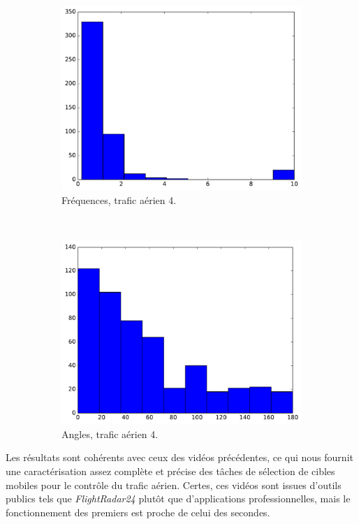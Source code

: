 \begin{figure}
\begin{subfigure}[t]{\subImgWclicks}
			\includegraphics[width=\textwidth]{figures/ch3/flightradar2a_frequency}
			\caption{Fréquences, trafic aérien 4.}
			\label{fig:flightradar2a_frequency}
		\end{subfigure}
		~
		\begin{subfigure}[t]{\subImgWclicks}
			\centering
			\includegraphics[width=\textwidth]{figures/ch3/flightradar2a_angle}
			\caption{Angles, trafic aérien 4.}
			\label{fig:flightradar2a_angle}
		\end{subfigure}
		\caption[Histogrammes, contrôle du trafic aérien, bis]{}
		\label{fig:histAirControl34}
	\end{figure}
	
	Les résultats sont cohérents avec ceux des vidéos précédentes, ce qui nous fournit une caractérisation assez complète et précise des tâches de sélection de cibles mobiles pour le contrôle du trafic aérien. Certes, ces vidéos sont issues d'outils publics tels que \emph{FlightRadar24} plutôt que d'applications professionnelles, mais le fonctionnement des premiers est proche de celui des secondes.
	
